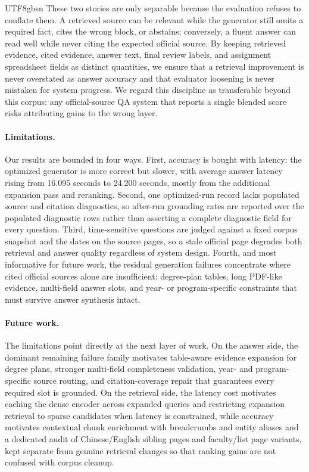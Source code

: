 \documentclass{article}
\begin{document}
\begin{CJK*}{UTF8}{gbsn}
These two stories are only separable because the evaluation refuses to conflate them. A retrieved source can be relevant while the generator still omits a required fact, cites the wrong block, or abstains; conversely, a fluent answer can read well while never citing the expected official source. By keeping retrieved evidence, cited evidence, answer text, final review labels, and assignment spreadsheet fields as distinct quantities, we ensure that a retrieval improvement is never overstated as answer accuracy and that evaluator loosening is never mistaken for system progress. We regard this discipline as transferable beyond this corpus: any official-source QA system that reports a single blended score risks attributing gains to the wrong layer.

\paragraph{Limitations.}
Our results are bounded in four ways. First, accuracy is bought with latency: the optimized generator is more correct but slower, with average answer latency rising from 16.095 seconds to 24.200 seconds, mostly from the additional expansion pass and reranking. Second, one optimized-run record lacks populated source and citation diagnostics, so after-run grounding rates are reported over the populated diagnostic rows rather than asserting a complete diagnostic field for every question. Third, time-sensitive questions are judged against a fixed corpus snapshot and the dates on the source pages, so a stale official page degrades both retrieval and answer quality regardless of system design. Fourth, and most informative for future work, the residual generation failures concentrate where cited official sources alone are insufficient: degree-plan tables, long PDF-like evidence, multi-field answer slots, and year- or program-specific constraints that must survive answer synthesis intact.

\paragraph{Future work.}
The limitations point directly at the next layer of work. On the answer side, the dominant remaining failure family motivates table-aware evidence expansion for degree plans, stronger multi-field completeness validation, year- and program-specific source routing, and citation-coverage repair that guarantees every required slot is grounded. On the retrieval side, the latency cost motivates caching the dense encoder across expanded queries and restricting expansion retrieval to sparse candidates when latency is constrained, while accuracy motivates contextual chunk enrichment with breadcrumbs and entity aliases and a dedicated audit of Chinese/English sibling pages and faculty/list page variants, kept separate from genuine retrieval changes so that ranking gains are not confused with corpus cleanup.


\end{CJK*}
\end{document}

